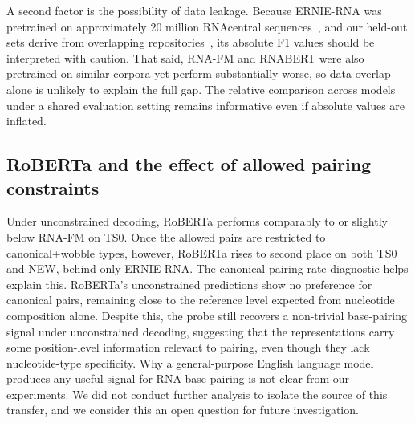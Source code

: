 \documentclass[logo,bsc,singlespacing,parskip]{infthesis}
\begin{document}
A second factor is the possibility of data leakage. 
Because ERNIE-RNA was pretrained on approximately 20 million RNAcentral sequences~\citep{yin2025ernie}, and our held-out sets derive from overlapping repositories~\citep{danaee2018bprna, kalvari2017rfam}, its absolute F1 values should be interpreted with caution. That said, RNA-FM and RNABERT were also pretrained on similar corpora yet perform substantially worse, so data overlap alone is unlikely to explain the full gap. The relative comparison across models under a shared evaluation setting remains informative even if absolute values are inflated.

\subsection{RoBERTa and the effect of allowed pairing constraints}
\label{sec:disc_roberta}

Under unconstrained decoding, RoBERTa performs comparably to or slightly below RNA-FM on TS0. Once the allowed pairs are restricted to canonical+wobble types, however, RoBERTa rises to second place on both TS0 and NEW, behind only ERNIE-RNA. The canonical pairing-rate diagnostic helps explain this. RoBERTa's unconstrained predictions show no preference for canonical pairs, remaining close to the reference level expected from nucleotide composition alone. Despite this, the probe still recovers a non-trivial base-pairing signal under unconstrained decoding, suggesting that the representations carry some position-level information relevant to pairing, even though they lack nucleotide-type specificity.
Why a general-purpose English language model produces any useful signal for RNA base pairing is not clear from our experiments. We did not conduct further analysis to isolate the source of this transfer, and we consider this an open question for future investigation.
\end{document}
